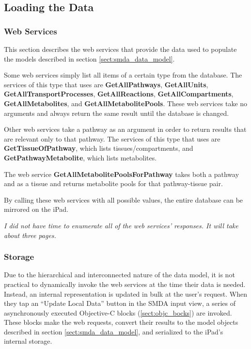 \subsection{Loading the Data}
\label{sect:smda_all_data}

\subsubsection{Web Services}
\label{sect:smda_web_services}

This section describes the web services that provide the data used to populate
the models described in section \ref{sect:smda_data_model}.

Some web services simply list all items of a certain type from the database. The
services of this type that \mawapp uses are \textbf{GetAllPathways},
\textbf{GetAllUnits}, \textbf{GetAllTransportProcesses},
\textbf{GetAllReactions}, \textbf{GetAllCompartments},
\textbf{GetAllMetabolites}, and \textbf{GetAllMetabolitePools}. These web
services take no arguments and always return the same result until the database
is changed.

Other web services take a pathway as an argument in order to return results that
are relevant only to that pathway. The services of this type that \mawapp uses
are \textbf{GetTissueOfPathway}, which lists tissues/compartments, and
\textbf{GetPathwayMetabolite}, which lists metabolites.

The web service \textbf{GetAllMetabolitePoolsForPathway} takes both a pathway
and as a tissue and returns metabolite pools for that pathway-tissue pair.

By calling these web services with all possible values, the entire database can
be mirrored on the iPad.

\emph{I did not have time to enumerate all of the web services' responses. It
will take about three pages.}

\subsubsection{Storage}

Due to the hierarchical and interconnected nature of the data model, it is not
practical to dynamically invoke the web services at the time their data is
needed. Instead, an internal representation is updated in bulk at the user's
request. When they tap an ``Update Local Data'' button in the SMDA input view, a
series of asynchronously executed Objective-C blocks (\ref{sect:objc_bocks}) are
invoked. These blocks make the web requests, convert their results to the model
objects described in section \ref{sect:smda_data_model}, and serialized to the
iPad's internal storage.

